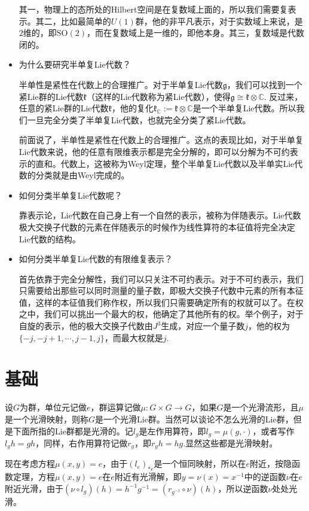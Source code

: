 \documentclass[9pt]{extarticle}
\newcommand{\cc}{\mathbb{C}}
\newcommand{\lag}{{\mathfrak{g}}}
\begin{document}
\begin{itemize}
其一，物理上的态所处的Hilbert空间是在复数域上面的，所以我们需要复表示。其二，比如最简单的$U(1)$群，他的非平凡表示，对于实数域上来说，是$2$维的，即$\mathrm{SO}(2)$，而在复数域上是一维的，即他本身。其三，复数域是代数闭的。

\item 为什么要研究半单复Lie代数？

半单性是紧性在代数上的合理推广。对于半单复Lie代数$\lag$，我们可以找到一个紧Lie群的Lie代数$\mathfrak{k}$（这样的Lie代数称为紧Lie代数），使得$\lag\cong \mathfrak{k}\otimes \cc$. 反过来，任意的紧Lie群的Lie代数$\mathfrak{k}$，他的复化$\mathfrak{k}_{\cc}:=\mathfrak{k}\otimes \cc$是一个半单复Lie代数。所以我们一旦完全分类了半单复Lie代数，也就完全分类了紧Lie代数。

前面说了，半单性是紧性在代数上的合理推广。这点的表现比如，对于半单复Lie代数来说，他的任意有限维表示都是完全分解的，即可以分解为不可约表示的直和。代数上，这被称为Weyl定理，整个半单复Lie代数以及半单实Lie代数的分类就是由Weyl完成的。

\item 如何分类半单复Lie代数呢？

靠表示论，Lie代数在自己身上有一个自然的表示，被称为伴随表示。Lie代数极大交换子代数的元素在伴随表示的时候作为线性算符的本征值将完全决定Lie代数的结构。

\item 如何分类半单复Lie代数的有限维复表示？

首先依靠于完全分解性，我们可以只关注不可约表示。对于不可约表示，我们只需要给出那些可以同时测量的量子数，即极大交换子代数中元素的所有本征值，这样的本征值我们称作权，所以我们只需要确定所有的权就可以了。在权之中，我们可以挑出一个最大的权，他确定了其他所有的权。举个例子，对于自旋的表示，他的极大交换子代数由$J^3$生成，对应一个量子数$j$，他的权为$\{-j,-j+1,\cdots,j-1,j\}$，而最大权就是$j$.

\end{itemize}

\section{基础}

\para 设$G$为群，单位元记做$e$，群运算记做$\mu:G\times G\to G$，如果$G$是一个光滑流形，且$\mu$是一个光滑映射，则称$G$是一个光滑Lie群。当然可以谈论不怎么光滑的Lie群，但是下面所指的Lie群都是光滑的。记$l_g$是左作用算符，即$l_g=\mu(g,\cdot)$，或者写作$l_gh=gh$，同样，右作用算符记做$r_g$，即$r_gh=hg$.显然这些都是光滑映射。

现在考虑方程$\mu(x,y)=e$，由于$(l_e)_{*e}$是一个恒同映射，所以在$e$附近，按隐函数定理，方程$\mu(x,y)=e$在$e$附近有光滑解，即$y=\nu(x)=x^{-1}$中的逆函数$\nu$在$e$附近光滑，由于$(\nu\circ l_g)(h)=h^{-1}g^{-1}=(r_{g^{-1}}\circ \nu)(h)$，所以逆函数$\nu$处处光滑。
\end{document}
